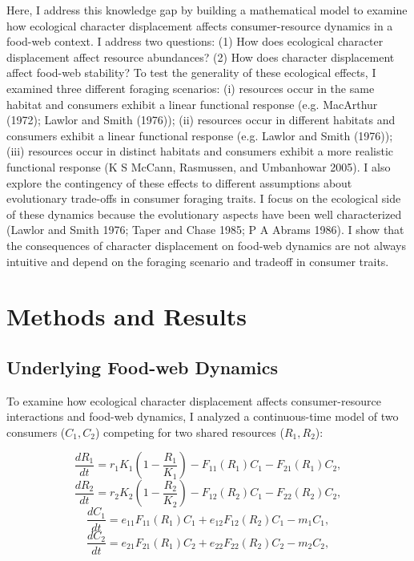 \documentclass[11pt,]{article}
\begin{document}
Here, I address this knowledge gap by building a mathematical model to
examine how ecological character displacement affects consumer-resource
dynamics in a food-web context. I address two questions: (1) How does
ecological character displacement affect resource abundances? (2) How
does character displacement affect food-web stability? To test the
generality of these ecological effects, I examined three different
foraging scenarios: (i) resources occur in the same habitat and
consumers exhibit a linear functional response (e.g. MacArthur (1972);
Lawlor and Smith (1976)); (ii) resources occur in different habitats and
consumers exhibit a linear functional response (e.g. Lawlor and Smith
(1976)); (iii) resources occur in distinct habitats and consumers
exhibit a more realistic functional response (K S McCann, Rasmussen, and
Umbanhowar 2005). I also explore the contingency of these effects to
different assumptions about evolutionary trade-offs in consumer foraging
traits. I focus on the ecological side of these dynamics because the
evolutionary aspects have been well characterized (Lawlor and Smith
1976; Taper and Chase 1985; P A Abrams 1986). I show that the
consequences of character displacement on food-web dynamics are not
always intuitive and depend on the foraging scenario and tradeoff in
consumer traits.

\section{Methods and Results}\label{methods-and-results}

\subsection{Underlying Food-web
Dynamics}\label{underlying-food-web-dynamics}

To examine how ecological character displacement affects
consumer-resource interactions and food-web dynamics, I analyzed a
continuous-time model of two consumers (\(C_1,C_2\)) competing for two
shared resources (\(R_1,R_2\)):

\[\frac{dR_1}{dt}=r_1K_1(1-\frac{R_1}{K_1})-F_{11}(R_1)C_1-F_{21}(R_1)C_2,\]
\[\frac{dR_2}{dt}=r_2K_2(1-\frac{R_2}{K_2})-F_{12}(R_2)C_1-F_{22}(R_2)C_2,\]
\[\frac{dC_1}{dt}=e_{11}F_{11}(R_1)C_1+e_{12}F_{12}(R_2)C_1-m_1C_1,\]
\[\frac{dC_2}{dt}=e_{21}F_{21}(R_1)C_2+e_{22}F_{22}(R_2)C_2-m_2C_2,\]
\end{document}

